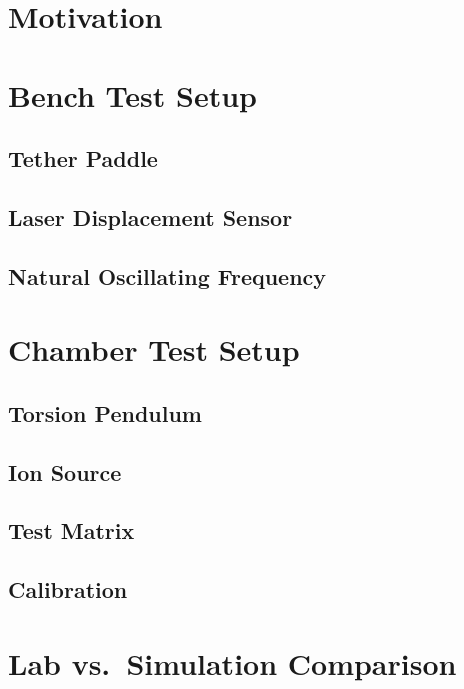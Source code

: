 \documentclass[conference]{IEEEtran}
\begin{document}
\section{Motivation}

\section{Bench Test Setup}

\subsection{Tether Paddle}

\subsection{Laser Displacement Sensor}

\subsection{Natural Oscillating Frequency}


\section{Chamber Test Setup}

\subsection{Torsion Pendulum}

\subsection{Ion Source}

\subsection{Test Matrix}

\subsection{Calibration}

\section{Lab vs.\ Simulation Comparison}
\end{document}

